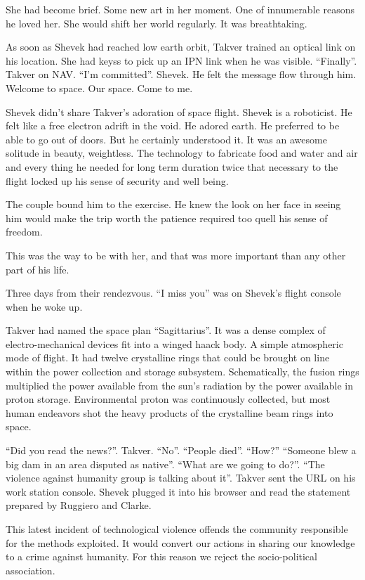 She had become brief.  Some new art in her moment.  One of innumerable
reasons he loved her.  She would shift her world regularly.  It was
breathtaking.

As soon as Shevek had reached low earth orbit, Takver trained an
optical link on his location.  She had keyss to pick up an IPN link
when he was visible.  ``Finally''.  Takver on NAV.  ``I'm committed''.
Shevek.  He felt the message flow through him.  Welcome to space.  Our
space.  Come to me.

Shevek didn't share Takver's adoration of space flight.  Shevek is a
roboticist.  He felt like a free electron adrift in the void.  He
adored earth.  He preferred to be able to go out of doors.  But he
certainly understood it.  It was an awesome solitude in beauty,
weightless.  The technology to fabricate food and water and air and
every thing he needed for long term duration twice that necessary to
the flight locked up his sense of security and well being.

The couple bound him to the exercise.  He knew the look on her face in
seeing him would make the trip worth the patience required too quell
his sense of freedom.  

This was the way to be with her, and that was more important than any
other part of his life.

Three days from their rendezvous.  ``I miss you'' was on Shevek's
flight console when he woke up.

Takver had named the space plan ``Sagittarius''.  It was a dense
complex of electro-mechanical devices fit into a winged haack body.  A
simple atmospheric mode of flight.  It had twelve crystalline rings
that could be brought on line within the power collection and storage
subsystem.  Schematically, the fusion rings multiplied the power
available from the sun's radiation by the power available in proton
storage.  Environmental proton was continuously collected, but most
human endeavors shot the heavy products of the crystalline beam rings
into space.

``Did you read the news?''.  Takver.  ``No''.  ``People died''.
``How?''  ``Someone blew a big dam in an area disputed as native''.
``What are we going to do?''.  ``The violence against humanity group
is talking about it''.  Takver sent the URL on his work station
console.  Shevek plugged it into his browser and read the statement
prepared by Ruggiero and Clarke.

{ \narrower

  This latest incident of technological violence offends the community
  responsible for the methods exploited.  It would convert our actions
  in sharing our knowledge to a crime against humanity.  For this
  reason we reject the socio-political association.

}

